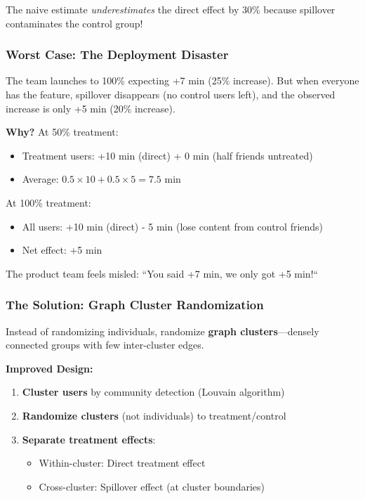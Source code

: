 The naive estimate \textit{underestimates} the direct effect by 30\% because spillover contaminates the control group!

\subsubsection{Worst Case: The Deployment Disaster}

The team launches to 100\% expecting +7 min (25\% increase). But when everyone has the feature, spillover disappears (no control users left), and the observed increase is only +5 min (20\% increase).

\textbf{Why?} At 50\% treatment:
\begin{itemize}
    \item Treatment users: +10 min (direct) + 0 min (half friends untreated)
    \item Average: $0.5 \times 10 + 0.5 \times 5 = 7.5$ min
\end{itemize}

At 100\% treatment:
\begin{itemize}
    \item All users: +10 min (direct) - 5 min (lose content from control friends)
    \item Net effect: +5 min
\end{itemize}

The product team feels misled: ``You said +7 min, we only got +5 min!``

\subsubsection{The Solution: Graph Cluster Randomization}

Instead of randomizing individuals, randomize \textbf{graph clusters}---densely connected groups with few inter-cluster edges.

\textbf{Improved Design:}
\begin{enumerate}
    \item \textbf{Cluster users} by community detection (Louvain algorithm)
    \item \textbf{Randomize clusters} (not individuals) to treatment/control
    \item \textbf{Separate treatment effects}:
    \begin{itemize}
        \item Within-cluster: Direct treatment effect
        \item Cross-cluster: Spillover effect (at cluster boundaries)
    \end{itemize}
\end{enumerate}

